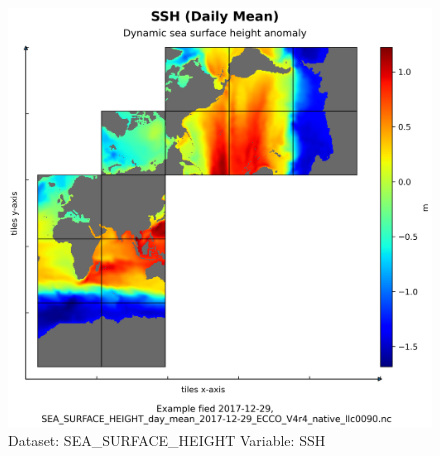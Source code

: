\begin{figure}[H]
\centering
\includegraphics[width=\textwidth]{../images/plots/native_plots/Sea_Surface_Height/SSH.png}
\caption{Dataset: SEA\_SURFACE\_HEIGHT Variable: SSH}
\label{tab:table-SEA_SURFACE_HEIGHT_SSH-Plot}
\end{figure}
\pagebreak
